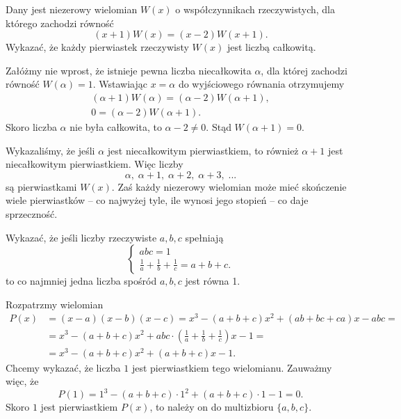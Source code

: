 \newpage
{}

\begin{problem}{1}
    Dany jest niezerowy wielomian $W(x)$ o współczynnikach rzeczywistych, dla którego zachodzi równość
    \[
        (x + 1)W(x) = (x - 2)W(x + 1).
    \]
    Wykazać, że każdy pierwiastek rzeczywisty $W(x)$ jest liczbą całkowitą.
\end{problem}

\noindent
Załóżmy nie wprost, że istnieje pewna liczba niecałkowita $\alpha$, dla której zachodzi równość $W(\alpha) = 1$. Wstawiając $x = \alpha$ do wyjściowego równania otrzymujemy
\begin{align*}
    (\alpha + 1)W(\alpha) = (\alpha - 2)W(\alpha + 1), \\
    0 = (\alpha - 2)W(\alpha + 1).
\end{align*}
Skoro liczba $\alpha$ nie była całkowita, to $\alpha - 2 \neq 0$. Stąd $W(\alpha + 1) = 0$.

Wykazaliśmy, że jeśli $\alpha$ jest niecałkowitym pierwiastkiem, to również $\alpha + 1$ jest niecałkowitym pierwiastkiem. Więc liczby
\[
    \alpha, \; \alpha + 1, \; \alpha + 2, \; \alpha + 3, \; ...
\]
są pierwiastkami $W(x)$. Zaś każdy niezerowy wielomian może mieć skończenie wiele pierwiastków -- co najwyżej tyle, ile wynosi jego stopień -- co daje sprzeczność.


\begin{problem}{2}
    Wykazać, że jeśli liczby rzeczywiste $a, b, c$ spełniają
    \[
    \begin{cases}
        abc = 1 \\
        \frac{1}{a} + \frac{1}{b} + \frac{1}{c} = a + b + c.
    \end{cases}
    \]
    to co najmniej jedna liczba spośród $a, b, c$ jest równa 1.
\end{problem}

\noindent
Rozpatrzmy wielomian
\begin{align*}
    P(x) &= (x - a)(x - b)(x - c) = x^3 - (a + b + c)x^2 + (ab + bc + ca)x - abc = \\
    &= x^3 - (a + b + c)x^2 + abc \cdot \left(\frac{1}{a} + \frac{1}{b} + \frac{1}{c}\right)x - 1 = \\
    &= x^3 - (a + b + c)x^2 + (a + b + c)x - 1.
\end{align*}
Chcemy wykazać, że liczba $1$ jest pierwiastkiem tego wielomianu. Zauważmy więc, że
\[
    P(1) = 1^3 - (a + b + c) \cdot 1^2 + (a + b + c)\cdot 1 - 1 = 0.
\]
Skoro $1$ jest pierwiastkiem $P(x)$, to należy on do multizbioru $\{a, b, c\}$.

